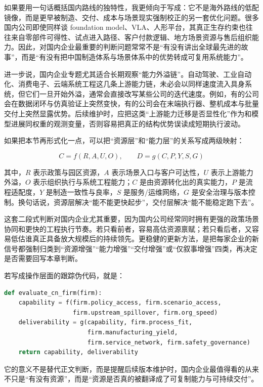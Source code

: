 如果要用一句话概括国内路线的独特性，我更倾向于写成：它不是海外路线的低配镜像，而是更早被制造、交付、成本与场景现实强制校正的另一套优化问题。很多国内公司即使同样谈 foundation model、VLA、人形平台，其真正生存约束也往往来自零部件可得性、试点进入路径、客户付款逻辑、地方场景资源与售后组织能力。因此，对国内企业最重要的判断问题常常不是“有没有讲出全球最先进的故事”，而是“有没有把中国制造体系与场景体系中的优势转成可复用系统能力”。

进一步说，国内企业专题尤其适合长期观察“能力外溢链”。自动驾驶、工业自动化、消费电子、云端系统工程这几条上游能力链，未必会以同样速度流入具身系统，但它们一旦开始外溢，通常会直接改写某些公司的迭代速度。例如，有的公司会在数据闭环与仿真验证上突然变快，有的公司会在末端执行器、整机成本与批量交付上突然显露优势。后续维护时，应把这类“上游能力迁移是否显性化”作为和模型进展同权重的观测变量，否则容易把真正的结构优势误读成短期执行波动。

如果把本节再形式化一点，可以把“资源层”和“能力层”的关系写成两级映射：

\begin{equation*}
C = f(R, A, U, O), \qquad D = g(C, P, Y, S, G)
\end{equation*}

其中，\(R\) 表示政策与园区资源，\(A\) 表示场景入口与客户可达性，\(U\) 表示上游能力外溢，\(O\) 表示组织执行与系统工程能力；\(C\) 是由资源转化出的真实能力，\(P\) 是流程适配度，\(Y\) 是制造一致性与良率，\(S\) 是服务/运维网络，\(G\) 是安全治理与版本控制。换句话说，资源层解决“能不能更快起步”，交付层解决“能不能稳定跑下去”。

这套二段式判断对国内企业尤其重要，因为国内公司经常同时拥有更强的政策场景协同和更快的工程执行节奏。若只看前者，容易高估资源禀赋；若只看后者，又容易低估谁真正具备放大规模后的持续领先。更稳健的更新方法，是把每家企业的新信号都强制归类到“资源增强”“能力增强”“交付增强”或“仅叙事增强”四类，再决定是否需要回写本章判断。

若写成操作层面的跟踪伪代码，就是：

\begin{lstlisting}[language=python]
def evaluate_cn_firm(firm):
    capability = f(firm.policy_access, firm.scenario_access,
                   firm.upstream_spillover, firm.org_speed)
    deliverability = g(capability, firm.process_fit,
                       firm.manufacturing_yield,
                       firm.service_network, firm.safety_governance)
    return capability, deliverability
\end{lstlisting}

它的意义不是替代正文判断，而是提醒后续版本维护时，国内企业最值得看的从来不只是“有没有资源”，而是“资源是否真的被翻译成了可复制能力与可持续交付”。

